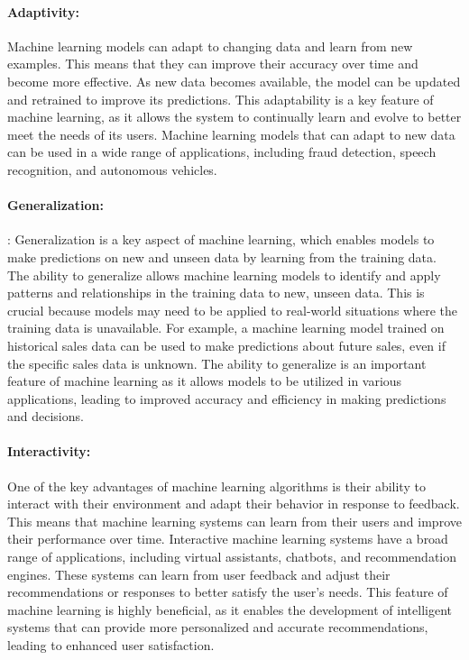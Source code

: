 		\paragraph{Adaptivity:}
		Machine learning models can adapt to changing data and learn from new examples. This means that they can improve their accuracy over time and become more effective. As new data becomes available, the model can be updated and retrained to improve its predictions. This adaptability is a key feature of machine learning, as it allows the system to continually learn and evolve to better meet the needs of its users. Machine learning models that can adapt to new data can be used in a wide range of applications, including fraud detection, speech recognition, and autonomous vehicles.  \cite{hastie2009elements}
	
		\paragraph{Generalization:}
		: Generalization is a key aspect of machine learning, which enables models to make predictions on new and unseen data by learning from the training data. The ability to generalize allows machine learning models to identify and apply patterns and relationships in the training data to new, unseen data. This is crucial because models may need to be applied to real-world situations where the training data is unavailable. For example, a machine learning model trained on historical sales data can be used to make predictions about future sales, even if the specific sales data is unknown. The ability to generalize is an important feature of machine learning as it allows models to be utilized in various applications, leading to improved accuracy and efficiency in making predictions and decisions. \cite{bishop2006pattern}
	
		\paragraph{Interactivity: }
		One of the key advantages of machine learning algorithms is their ability to interact with their environment and adapt their behavior in response to feedback. This means that machine learning systems can learn from their users and improve their performance over time. Interactive machine learning systems have a broad range of applications, including virtual assistants, chatbots, and recommendation engines. These systems can learn from user feedback and adjust their recommendations or responses to better satisfy the user's needs. This feature of machine learning is highly beneficial, as it enables the development of intelligent systems that can provide more personalized and accurate recommendations, leading to enhanced user satisfaction. \cite{amershi2014power}
	
